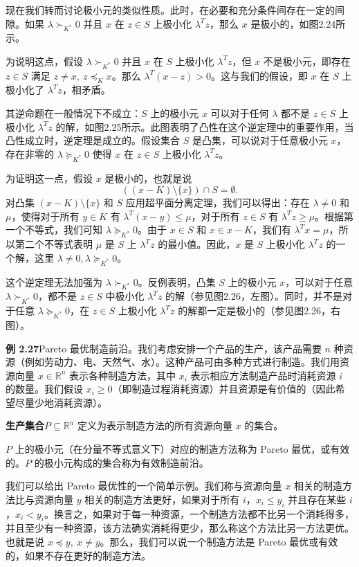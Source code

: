 \documentclass[UTF8,12pt,a4paper,fontset=fandol]{ctexart}
\begin{document}
现在我们转而讨论极小元的类似性质。此时，在必要和充分条件间存在一定的间隙。如果 $\lambda\succ_{K^*}0$ 并且 $x$ 在 $z\in S$ 上极小化 $\lambda^Tz$，那么 $x$ 是极小的，如图2.24所示。

为说明这点，假设 $\lambda\succ_{K^*}0$ 并且 $x$ 在 $S$ 上极小化 $\lambda^Tz$，但 $x$ 不是极小元，即存在 $z\in S$ 满足 $z\ne x,\ z\preceq_K x$。那么 $\lambda^T(x-z)>0$。这与我们的假设，即 $x$ 在 $S$ 上极小化了 $\lambda^Tz$，相矛盾。

其逆命题在一般情况下不成立：$S$ 上的极小元 $x$ 可以对于任何 $\lambda$ 都不是 $z\in S$ 上极小化 $\lambda^Tz$ 的解，如图2.25所示。此图表明了凸性在这个逆定理中的重要作用，当凸性成立时，逆定理是成立的。假设集合 $S$ 是凸集，可以说对于任意极小元 $x$，存在非零的 $\lambda\succeq_{K^*}0$ 使得 $x$ 在 $z\in S$ 上极小化 $\lambda^Tz$。

为证明这一点，假设 $x$ 是极小的，也就是说
\[
  ((x-K)\setminus\{x\})\cap S=\emptyset.
\]
对凸集 $(x-K)\setminus\{x\}$ 和 $S$ 应用超平面分离定理，我们可以得出：存在 $\lambda\ne0$ 和 $\mu$，使得对于所有 $y\in K$ 有 $\lambda^T(x-y)\le\mu$，对于所有 $z\in S$ 有 $\lambda^Tz\ge\mu$。根据第一个不等式，我们可知 $\lambda\succeq_{K^*}0$。由于 $x\in S$ 和 $x\in x-K$，我们有 $\lambda^Tx=\mu$，所以第二个不等式表明 $\mu$ 是 $S$ 上 $\lambda^Tz$ 的最小值。因此，$x$ 是 $S$ 上极小化 $\lambda^Tz$ 的一个解，这里 $\lambda\ne0,\lambda\succeq_{K^*}0$。

这个逆定理无法加强为 $\lambda\succ_{K^*}0$。反例表明，凸集 $S$ 上的极小元 $x$，可以对于任意 $\lambda\succ_{K^*}0$，都不是 $z\in S$ 中极小化 $\lambda^Tz$ 的解（参见图2.26，左图）。同时，并不是对于任意 $\lambda\succeq_{K^*}0$，在 $z\in S$ 上极小化 $\lambda^Tz$ 的解都一定是极小的（参见图2.26，右图）。

\noindent\textbf{例 2.27}\quad Pareto 最优制造前沿。我们考虑安排一个产品的生产，该产品需要 $n$ 种资源（例如劳动力、电、天然气、水）。这种产品可由多种方式进行制造。我们用资源向量 $x\in\mathbb{R}^n$ 表示各种制造方法，其中 $x_i$ 表示相应方法制造产品时消耗资源 $i$ 的数量。我们假设 $x_i\ge0$（即制造过程消耗资源）并且资源是有价值的（因此希望尽量少地消耗资源）。

\noindent\textbf{生产集合}\quad $P\subseteq\mathbb{R}^n$ 定义为表示制造方法的所有资源向量 $x$ 的集合。

$P$ 上的极小元（在分量不等式意义下）对应的制造方法称为 Pareto 最优，或有效的。$P$ 的极小元构成的集合称为有效制造前沿。

我们可以给出 Pareto 最优性的一个简单示例。我们称与资源向量 $x$ 相关的制造方法比与资源向量 $y$ 相关的制造方法更好，如果对于所有 $i$，$x_i\le y_i$ 并且存在某些 $i$，$x_i<y_i$。换言之，如果对于每一种资源，一个制造方法都不比另一个消耗得多，并且至少有一种资源，该方法确实消耗得更少，那么称这个方法比另一方法更优。也就是说 $x\preceq y,\ x\ne y$。那么，我们可以说一个制造方法是 Pareto 最优或有效的，如果不存在更好的制造方法。
\end{document}

